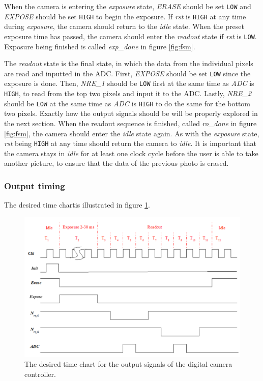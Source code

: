 When the camera is entering the \emph{exposure} state, \emph{ERASE} should be set \verb|LOW| and \emph{EXPOSE} should be set \verb|HIGH| to begin the exposure. If \emph{rst} is \verb|HIGH| at any time during \emph{exposure}, the camera should return to the \emph{idle} state. When the preset exposure time has passed, the camera should enter the \emph{readout} state if \emph{rst} is \verb|LOW|. Exposure being finished is called \emph{exp\_done} in figure \ref{fig:fsm}.

The \emph{readout} state is the final state, in which the data from the individual pixels are read and inputted in the ADC. First, \emph{EXPOSE} should be set \verb|LOW| since the exposure is done. Then, \emph{NRE\_1} should be \verb|LOW| first at the same time as \emph{ADC} is \verb|HIGH|, to read from the top two pixels and input it to the ADC. Lastly, \emph{NRE\_2} should be \verb|LOW| at the same time as \emph{ADC} is \verb|HIGH| to do the same for the bottom two pixels. Exactly how the output signals should be will be properly explored in the next section. When the readout sequence is finished, called \emph{ro\_done} in figure \ref{fig:fsm}, the camera should enter the \emph{idle} state again. As with the \emph{exposure} state, \emph{rst} being \verb|HIGH| at any time should return the camera to \emph{idle}. It is important that the camera stays in \emph{idle} for at least one clock cycle before the user is able to take another picture, to ensure that the data of the previous photo is erased.

\subsubsection{Output timing}

The desired time chartis illustrated in figure \ref{fig:timechart}.

\begin{figure}[H]
    \centering
    \includegraphics[width=\textwidth]{graphs/time_chart.png}
    \caption{The desired time chart for the output signals of the digital camera controller.}
    \label{fig:timechart}
\end{figure}

